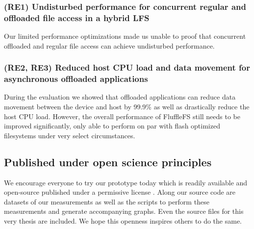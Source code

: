 \subsubsection*{(RE1) Undisturbed performance for concurrent regular and
offloaded file access in a hybrid LFS}

Our limited performance optimizations made us unable to proof that concurrent
offloaded and regular file access can achieve undisturbed performance.

\subsubsection*{(RE2, RE3) Reduced host CPU load and data movement for
asynchronous offloaded applications}

During the evaluation we showed that offloaded applications can reduce
data movement between the device and host by 99.9\% as well as drastically
reduce the host CPU load. However, the overall performance of FluffleFS still
needs to be improved significantly, only able to perform on par with flash
optimized filesystems under very select circumstances. 

\subsection*{Published under open science principles}

We encourage everyone to try our prototype today which is readily available
and open-source published under a permissive license \cite{qemu-csd}. Along our
source code are datasets of our measurements as well as the scripts to perform
these measurements and generate accompanying graphs. Even the source files for
this very thesis are included. We hope this openness inspires others to do the
same.

